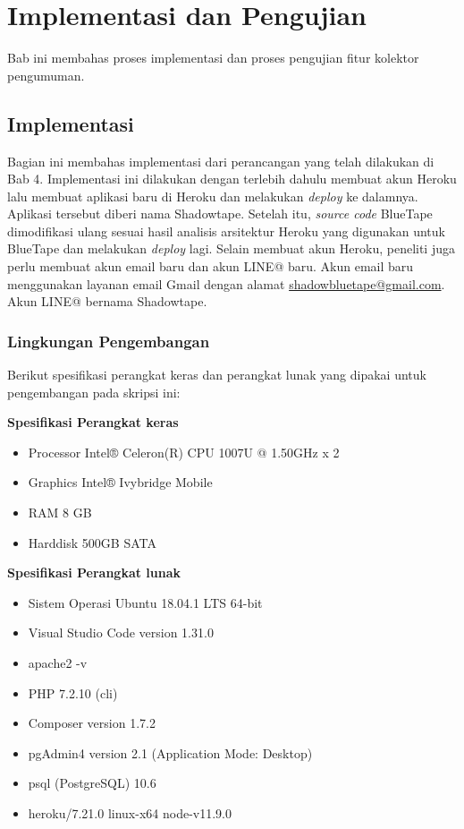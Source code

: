 
\chapter{Implementasi dan Pengujian}
\label{chap:implementasiDanPengujian}

Bab ini membahas proses implementasi dan proses pengujian fitur kolektor pengumuman.
\section{Implementasi}
Bagian ini membahas implementasi dari perancangan yang telah dilakukan di Bab 4. Implementasi ini dilakukan dengan terlebih dahulu membuat akun Heroku lalu membuat aplikasi baru di Heroku dan melakukan \textit{deploy} ke dalamnya. Aplikasi tersebut diberi nama Shadowtape. Setelah itu, \textit{source code} BlueTape dimodifikasi ulang sesuai hasil analisis arsitektur Heroku yang digunakan untuk BlueTape dan melakukan \textit{deploy} lagi. Selain membuat akun Heroku, peneliti juga perlu membuat akun email baru dan akun LINE@ baru. Akun email baru menggunakan layanan email Gmail dengan alamat \href{mail-to:shadowbluetape@gmail.com}{shadowbluetape@gmail.com}. Akun LINE@ bernama Shadowtape.

\subsection{Lingkungan Pengembangan}
Berikut spesifikasi perangkat keras dan perangkat lunak yang dipakai untuk pengembangan pada skripsi ini:

\textbf{Spesifikasi Perangkat keras}
\begin{itemize}
\item Processor Intel® Celeron(R) CPU 1007U @ 1.50GHz x 2 
\item Graphics Intel® Ivybridge Mobile
\item RAM 8 GB
\item Harddisk 500GB SATA
\end{itemize}

\textbf{Spesifikasi Perangkat lunak}
\begin{itemize}
\item Sistem Operasi Ubuntu 18.04.1 LTS 64-bit
\item Visual Studio Code version 1.31.0
\item apache2 -v
\item PHP 7.2.10 (cli)
\item Composer version 1.7.2
\item pgAdmin4 version 2.1 (Application Mode: Desktop)
\item psql (PostgreSQL) 10.6
\item heroku/7.21.0 linux-x64 node-v11.9.0
\end{itemize}

